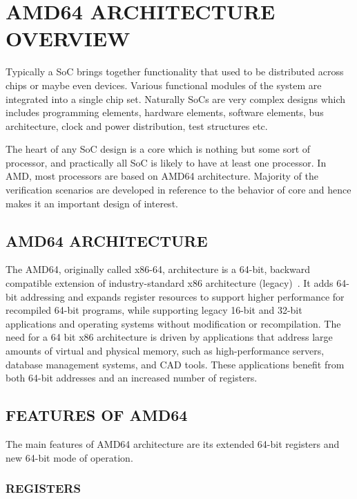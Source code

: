 \chapter{AMD64 ARCHITECTURE OVERVIEW}
\label{chap:amd64}
Typically a SoC brings together functionality that used to be distributed across chips or maybe even devices. Various functional modules of the system are integrated into a single chip set. Naturally SoCs are very complex designs which includes programming elements, hardware elements, software elements, bus architecture, clock and power distribution, test structures etc. 

The heart of any SoC design is a core which is nothing but some sort of processor, and practically all SoC is likely to have at least one processor. In AMD, most processors are based on AMD64 architecture. Majority of the verification scenarios are developed in reference to the behavior of core and hence makes it an important design of interest.

\section {AMD64 ARCHITECTURE}
The AMD64, originally called x86-64, architecture is a 64-bit, backward compatible extension of industry-standard x86 architecture (legacy)~\citep{SS:AMD64-V1}. It adds 64-bit addressing and expands register resources to support higher performance for recompiled 64-bit programs, while supporting legacy 16-bit and 32-bit applications and operating systems without modification or recompilation. The need for a 64 bit x86 architecture is driven by applications that address large amounts of virtual and physical memory, such as high-performance servers, database management systems, and CAD tools. These applications benefit from both 64-bit addresses and an increased number of registers.



\section {FEATURES OF AMD64}
The main features of AMD64 architecture are its extended 64-bit registers and new 64-bit mode of operation.  
\subsection{REGISTERS}

